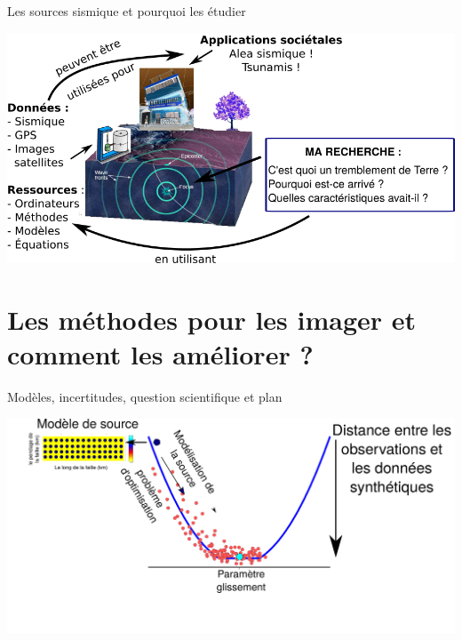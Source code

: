 \documentclass{beamer}
\begin{document}
\begin{frame}
{Les sources sismique et pourquoi les étudier}

    \begin{center}
        \vskip -0.3cm \includegraphics[width=1\linewidth]{images/earthquake_whys_whats_3-1} \\     
    \end{center}
    \addtocounter{framenumber}{-1}
    
\end{frame}


\section{Les méthodes pour les imager et comment les améliorer ?}

\begin{frame}
 {Modèles, incertitudes, question scientifique et plan}

 \includegraphics[width=1\linewidth]{images/uncertainty_1.pdf}
 
\end{frame}
\end{document}
